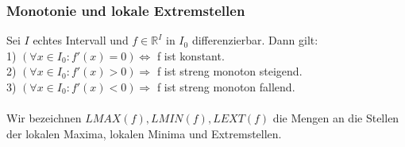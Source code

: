 \documentclass{article}
\begin{document}
\subsubsection*{Monotonie und lokale Extremstellen}
Sei \(I\) echtes Intervall und \(f \in \mathbb R ^I\) in \(I_0\) differenzierbar. Dann gilt:\\
1) \((\forall x \in I_0: f'(x) = 0) \Longleftrightarrow \) f ist konstant. \\
2) \((\forall x \in I_0: f'(x) > 0) \Longrightarrow \) f ist streng monoton steigend. \\
3) \((\forall x \in I_0: f'(x) < 0) \Longrightarrow \) f ist streng monoton fallend. \\ \\
Wir bezeichnen \(LMAX(f), LMIN(f), LEXT(f)\) die Mengen an die Stellen der lokalen Maxima, lokalen Minima und Extremstellen.
\end{document}
